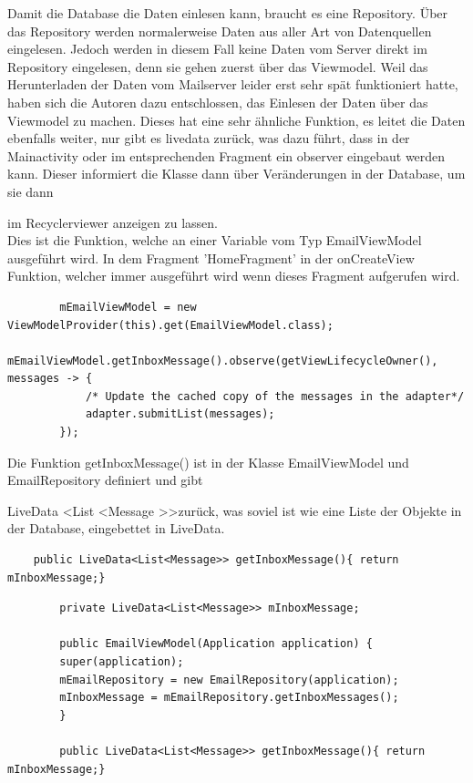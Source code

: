 \documentclass[a4paper,11pt]{article}
\begin{document}
Damit die Database die Daten einlesen kann, braucht es eine Repository. Über das Repository werden normalerweise Daten aus aller Art von Datenquellen eingelesen. Jedoch
werden in diesem Fall keine Daten vom Server direkt im Repository eingelesen, denn sie gehen zuerst über das Viewmodel.
Weil das Herunterladen der Daten vom Mailserver leider erst sehr spät funktioniert hatte, 
haben sich die Autoren dazu entschlossen, das Einlesen der Daten über das Viewmodel zu machen. Dieses hat eine sehr ähnliche Funktion, 
es leitet die Daten ebenfalls weiter, nur gibt es \gls{livedata} zurück, was dazu führt, dass in der Mainactivity oder im entsprechenden Fragment ein \gls{observer} 
eingebaut werden kann. Dieser informiert die Klasse dann über Veränderungen in der Database, um sie dann

im Recyclerviewer anzeigen zu lassen.
\cite{appStructurePicture}\\


Dies ist die Funktion, welche an einer Variable vom Typ EmailViewModel ausgeführt wird. In dem Fragment 'HomeFragment' in der
onCreateView Funktion, welcher immer ausgeführt wird wenn dieses Fragment aufgerufen wird. 


\lstset{language=java}
\begin{lstlisting}
        mEmailViewModel = new ViewModelProvider(this).get(EmailViewModel.class);
        mEmailViewModel.getInboxMessage().observe(getViewLifecycleOwner(), messages -> {
            /* Update the cached copy of the messages in the adapter*/
            adapter.submitList(messages);
        });
\end{lstlisting}

\begingroup
\nohyphenation

Die Funktion getInboxMessage() ist in der Klasse EmailViewModel und EmailRepository definiert und gibt 

LiveData \textless List \textless Message \textgreater \textgreater  zurück, was soviel ist wie eine Liste der Objekte in der Database, eingebettet 
in LiveData.

\endgroup

\lstset{language=java}
\begin{lstlisting}
    public LiveData<List<Message>> getInboxMessage(){ return mInboxMessage;}

\end{lstlisting}

\lstset{language=java}
\begin{lstlisting}
        private LiveData<List<Message>> mInboxMessage;

        public EmailViewModel(Application application) {
        super(application);
        mEmailRepository = new EmailRepository(application);
        mInboxMessage = mEmailRepository.getInboxMessages();
        }

        public LiveData<List<Message>> getInboxMessage(){ return mInboxMessage;}

\end{lstlisting}
\end{document}
